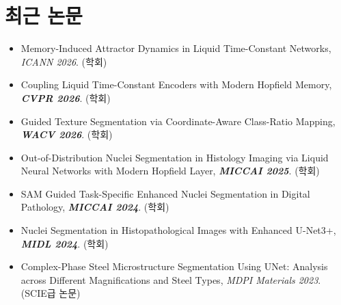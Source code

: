 \documentclass[10pt, letterpaper]{article}
\newenvironment{highlights}{
	\begin{itemize}[
		topsep=0.10cm,
		parsep=0.05cm,
		partopsep=0pt,
		itemsep=0pt,
		leftmargin=14pt
		]
	}{
	\end{itemize}
}
\begin{document}
	\section{최근 논문}
	\begin{highlights}
		\item Memory-Induced Attractor Dynamics in Liquid Time-Constant Networks, \textit{ICANN 2026}. (학회)
		\item Coupling Liquid Time-Constant Encoders with Modern Hopfield Memory, \textit{\textbf{CVPR 2026}}. (학회)
		\item Guided Texture Segmentation via Coordinate-Aware Class-Ratio Mapping, \textit{\textbf{WACV 2026}}. (학회)
		\item Out-of-Distribution Nuclei Segmentation in Histology Imaging via Liquid Neural Networks with Modern Hopfield Layer, \textit{\textbf{MICCAI 2025}}. (학회)
		\item SAM Guided Task-Specific Enhanced Nuclei Segmentation in Digital Pathology, \textit{\textbf{MICCAI 2024}}. (학회)
		\item Nuclei Segmentation in Histopathological Images with Enhanced U-Net3+, \textit{\textbf{MIDL 2024}}. (학회)
		\item Complex-Phase Steel Microstructure Segmentation Using UNet: Analysis across Different Magnifications and Steel Types, \textit{MDPI Materials 2023}. (SCIE급 논문)
	\end{highlights}
	
	
\end{document}
